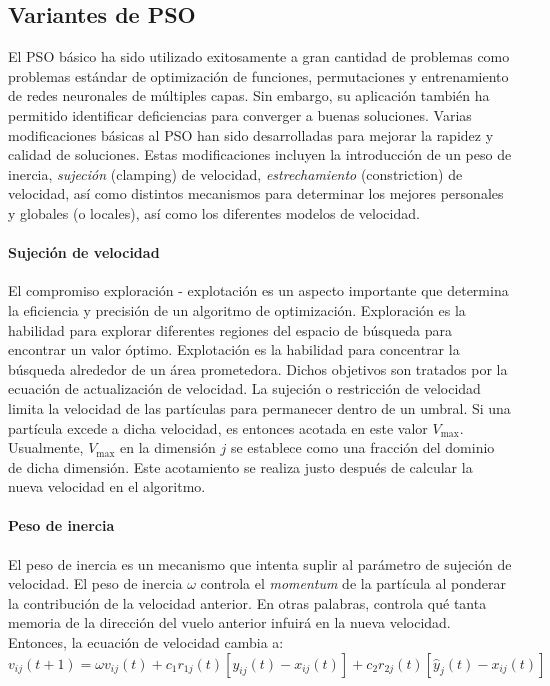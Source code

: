 \documentclass{article}
\begin{document}
\subsection{Variantes de PSO}
El PSO básico ha sido utilizado exitosamente a gran cantidad de problemas como problemas estándar de optimización de funciones, permutaciones y entrenamiento de redes neuronales de múltiples capas.
Sin embargo, su aplicación también ha permitido identificar deficiencias para converger a buenas soluciones.
Varias modificaciones básicas al PSO han sido desarrolladas para mejorar la rapidez y calidad de soluciones.
Estas modificaciones incluyen la introducción de un peso de inercia, \emph{sujeción} (clamping) de velocidad, \emph{estrechamiento} (constriction) de velocidad, así como distintos mecanismos para determinar los mejores personales y globales (o locales), así como los diferentes modelos de velocidad.

\paragraph{Sujeción de velocidad}
El compromiso exploración - explotación es un aspecto importante que determina la eficiencia y precisión de un algoritmo de optimización.
Exploración es la habilidad para explorar diferentes regiones del espacio de búsqueda para encontrar un valor óptimo.
Explotación es la habilidad para concentrar la búsqueda alrededor de un área prometedora.
Dichos objetivos son tratados por la ecuación de actualización de velocidad.
La sujeción o restricción de velocidad limita la velocidad de las partículas para permanecer dentro de un umbral.
Si una partícula excede a dicha velocidad, es entonces acotada en este valor $V_{\text{max}}$.
Usualmente, $V_{\text{max}}$ en la dimensión $j$ se establece como una fracción del dominio de dicha dimensión.
Este acotamiento se realiza justo después de calcular la nueva velocidad en el algoritmo.

\paragraph{Peso de inercia}
El peso de inercia es un mecanismo que intenta suplir al parámetro de sujeción de velocidad.
El peso de inercia $\omega$ controla el \emph{momentum} de la partícula al ponderar la contribución de la velocidad anterior.
En otras palabras, controla qué tanta memoria de la dirección del vuelo anterior infuirá en la nueva velocidad.
Entonces, la ecuación de velocidad cambia a:
\begin{equation}
	v_{ij}(t+1) = \omega v_{ij}(t) + c_1r_{1j}(t)[y_{ij}(t) - x_{ij}(t)] + c_2 r_{2j}(t)[\hat{y}_j(t) - x_{ij}(t)]
	\label{eq:velocidad-peso-inercia}
\end{equation}
\end{document}
